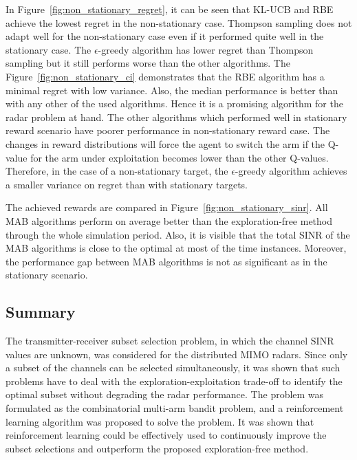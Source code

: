 \documentclass[english, 12pt, a4paper, elec, utf8, a-1b, online]{aaltothesis}
\begin{document}
In Figure~\ref{fig:non_stationary_regret}, it can be seen that KL-UCB and RBE achieve the lowest regret in the non-stationary case.
Thompson sampling does not adapt well for the non-stationary case even if it performed quite well in the stationary case.
The $\epsilon$-greedy algorithm has lower regret than Thompson sampling but it still performs worse than the other algorithms. 
The Figure~\ref{fig:non_stationary_ci} demonstrates that the RBE algorithm has a minimal regret with low variance.
Also, the median performance is better than with any other of the used algorithms.
Hence it is a promising algorithm for the radar problem at hand. 
The other algorithms which performed well in stationary reward scenario have poorer performance in non-stationary reward case.
The changes in reward distributions will force the agent to switch the arm if the Q-value for the arm under exploitation becomes lower than the other Q-values.
Therefore, in the case of a non-stationary target, the $\epsilon$-greedy algorithm achieves a smaller variance on regret than with stationary targets.

The achieved rewards are compared in Figure~\ref{fig:non_stationary_sinr}.
All MAB algorithms perform on average better than the exploration-free method through the whole simulation period.
Also, it is visible that the total SINR of the MAB algorithms is close to the optimal at most of the time instances. 
Moreover, the performance gap between MAB algorithms is not as significant as in the stationary scenario.

\subsection{Summary}
\label{sec:tx_rx_summary}

The transmitter-receiver subset selection problem, in which the channel SINR values are unknown, was considered for the distributed MIMO radars.
Since only a subset of the channels can be selected simultaneously, it was shown that such problems have to deal with the exploration-exploitation trade-off to identify the optimal subset without degrading the radar performance.
The problem was formulated as the combinatorial multi-arm bandit problem, and a reinforcement learning algorithm was proposed to solve the problem.
It was shown that reinforcement learning could be effectively used to continuously improve the subset selections and outperform the proposed exploration-free method.



\newpage
\end{document}
